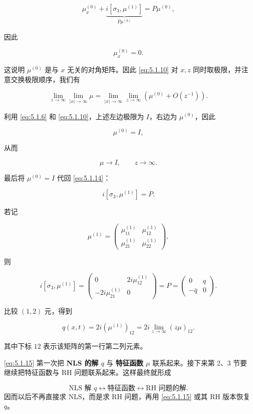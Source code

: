 \documentclass[
    lang=cn,
    scheme=chinese,
    mode=simple,
    device=normal,
    color=blue,
    math=cm,
    thmcnt=section,
    12pt,
    nowatermark
]{elegantbook}
\begin{document}
\[
    \mu_x^{(0)}
    +\underbrace{i[\sigma_3,\mu^{(1)}]}_{P\mu^{(0)}}
    =P\mu^{(0)},
\]

因此

\[
    \mu_x^{(0)}=0.
\]

这说明 $\mu^{(0)}$ 是与 $x$ 无关的对角矩阵。因此 \eqref{eq:5.1.10} 对 $x,z$ 同时取极限，并注意交换极限顺序，我们有

\[
    \lim\limits_{z\to\infty}\lim\limits_{\lvert x\rvert\to\infty}\mu
    =
    \lim\limits_{\lvert x\rvert\to\infty}\lim\limits_{z\to\infty}
    \left(\mu^{(0)}+O(z^{-1})\right).
\]

利用 \eqref{eq:5.1.6} 和 \eqref{eq:5.1.10}，上述左边极限为 $I$，右边为 $\mu^{(0)}$，因此

\[
    \mu^{(0)}=I,
\]

从而

\[
    \mu\to I,\qquad z\to\infty.
\]

最后将 $\mu^{(0)}=I$ 代回 \eqref{eq:5.1.14}：

\[
    i[\sigma_3,\mu^{(1)}]=P.
\]

若记

\[
    \mu^{(1)}=
    \begin{pmatrix}
        \mu_{11}^{(1)} & \mu_{12}^{(1)} \\
        \mu_{21}^{(1)} & \mu_{22}^{(1)}
    \end{pmatrix},
\]

则

\[
    i[\sigma_3,\mu^{(1)}]
    =
    \begin{pmatrix}
        0 & 2i\mu_{12}^{(1)} \\
        -2i\mu_{21}^{(1)} & 0
    \end{pmatrix}
    =
    P
    =
    \begin{pmatrix}
        0 & q \\
        -\bar q & 0
    \end{pmatrix}.
\]

比较 $(1,2)$ 元，得到

\begin{equation}
    q(x,t)
    =
    2i(\mu^{(1)})_{12}
    =
    2i\lim\limits_{z\to\infty}(z\mu)_{12}.
    \tag{5.1.15}
    \label{eq:5.1.15}
\end{equation}

其中下标 $12$ 表示该矩阵的第一行第二列元素。

\begin{callout}
    \eqref{eq:5.1.15} 第一次把 \textbf{NLS 的解 $q$} 与 \textbf{特征函数 $\mu$} 联系起来。接下来第 2、3 节要继续把特征函数与 RH 问题联系起来。这样最终就形成

    \[
        \text{NLS 解 }q
        \longleftrightarrow
        \text{特征函数}
        \longleftrightarrow
        \text{RH 问题的解}.
    \]
    因而以后不再直接求 NLS，而是求 RH 问题，再用 \eqref{eq:5.1.15} 或其 RH 版本恢复 $q$。
\end{callout}
\end{document}

